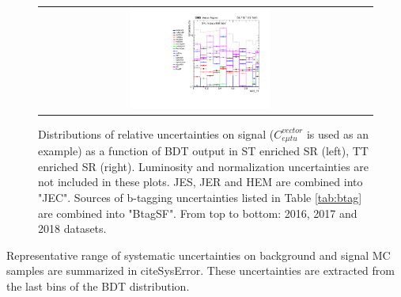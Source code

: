\begin{figure}[tbh!]
\begin{center}
\begin{tabular}{cc}
  \includegraphics[width=0.45\textwidth]{figures/Part3/Systematics/sysBDT_TT_sig_2018} \\
 \end{tabular}
 \caption{Distributions of relative uncertainties on signal ($C_{e\mu tu}^{vector}$ is used as an example) as a function of BDT output in ST enriched SR (left), TT enriched SR (right). Luminosity and normalization uncertainties are not included in these plots. JES, JER and HEM are combined into "JEC". Sources of b-tagging uncertainties listed in Table \ref{tab:btag} are combined into "BtagSF". From top to bottom: 2016, 2017 and 2018 datasets.}
 \label{fig:Comp_sys_signal}
 \end{center}
\end{figure}

Representative range of systematic uncertainties on background and signal MC samples are summarized in cite{SysError}. These uncertainties are extracted from the last bins of the BDT distribution.